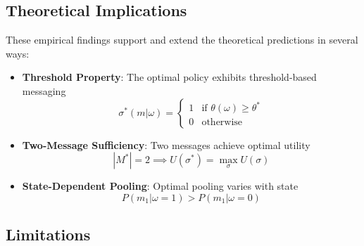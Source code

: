 \documentclass[12pt]{article}
\begin{document}
\subsection{Theoretical Implications}
These empirical findings support and extend the theoretical predictions in several ways:

\begin{itemize}
    \item \textbf{Threshold Property}: The optimal policy exhibits threshold-based messaging
    \begin{equation}
        \sigma^*(m|\omega) = \begin{cases}
            1 & \text{if } \theta(\omega) \geq \theta^* \\
            0 & \text{otherwise}
        \end{cases}
    \end{equation}
    
    \item \textbf{Two-Message Sufficiency}: Two messages achieve optimal utility
    \begin{equation}
        |M^*| = 2 \implies U(\sigma^*) = \max_{\sigma} U(\sigma)
    \end{equation}
    
    \item \textbf{State-Dependent Pooling}: Optimal pooling varies with state
    \begin{equation}
        P(m_1|\omega=1) > P(m_1|\omega=0)
    \end{equation}
\end{itemize}

\subsection{Limitations}
\end{document}
